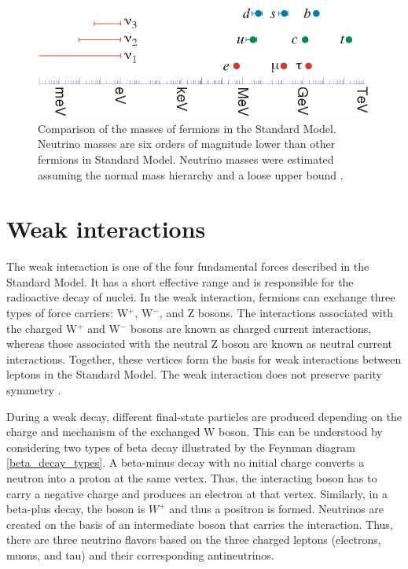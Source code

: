 \vspace{0.3cm}
\begin{figure}[!htb]
\centering
\includegraphics[width=0.85\linewidth]{ch1/figs/n_mass_comp.png}
\vspace{0.3cm}
\caption{Comparison of the masses of fermions in the Standard Model. Neutrino masses are six orders of magnitude lower than other fermions in Standard Model. Neutrino masses were estimated assuming the normal mass hierarchy and a loose upper bound \cite{Hewett:2012ns}.}
\label{n_mass_comp}
\end{figure}

\section{Weak interactions}
The weak interaction is one of the four fundamental forces described in the Standard Model. It has a short effective range and is responsible for the radioactive decay of nuclei. In the weak interaction, fermions can exchange three types of force carriers: W$^+$, W$^-$, and Z bosons. The interactions associated with the charged W$^+$ and W$^-$ bosons are known as charged current interactions, whereas those associated with the neutral Z boson are known as neutral current interactions. Together, these vertices form the basis for weak interactions between leptons in the Standard Model. The weak interaction does not preserve parity symmetry \cite{wu_experiment}.

During a weak decay, different final-state particles are produced depending on the charge and mechanism of the exchanged W boson. This can be understood by considering two types of beta decay illustrated by the Feynman diagram \ref{beta_decay_types}. A beta-minus decay with no initial charge converts a neutron into a proton at the same vertex. Thus, the interacting boson has to carry a negative charge and produces an electron at that vertex. Similarly, in a beta-plus decay, the boson is $W^+$ and thus a positron is formed. Neutrinos are created on the basis of an intermediate boson that carries the interaction. Thus, there are three neutrino flavors based on the three charged leptons (electrons, muons, and tau) and their corresponding antineutrinos. 


